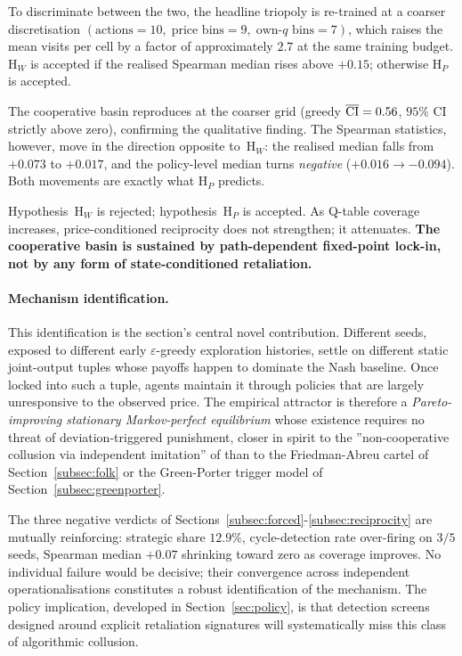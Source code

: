 To discriminate between the two, the headline triopoly is
re-trained at a coarser discretisation
$(\text{actions} = 10,\;\text{price bins} = 9,\;
\text{own-}q\text{ bins} = 7)$, which raises the mean visits per
cell by a factor of approximately $2.7$ at the same training
budget. H$_W$ is accepted if the realised Spearman median rises
above $+0.15$; otherwise H$_P$ is accepted.

The cooperative basin reproduces at the coarser grid (greedy
$\overline{\mathrm{CI}} = 0.56$, $95\%$ CI strictly above zero), confirming the
qualitative finding. The Spearman statistics, however, move in
the direction opposite to~H$_W$: the realised median falls from
$+0.073$ to $+0.017$, and the policy-level median turns
\emph{negative} ($+0.016 \to -0.094$). Both movements are
exactly what H$_P$ predicts.

\begin{verdict*}
Hypothesis~H$_W$ is rejected; hypothesis~H$_P$ is accepted. As
Q-table coverage increases, price-conditioned reciprocity does
not strengthen; it attenuates. \textbf{The cooperative basin is
sustained by path-dependent fixed-point lock-in, not by any form
of state-conditioned retaliation.}
\end{verdict*}

\paragraph{Mechanism identification.}
This identification is the section's central novel contribution.
Different seeds, exposed to different early $\varepsilon$-greedy
exploration histories, settle on different static joint-output
tuples whose payoffs happen to dominate the Nash baseline. Once
locked into such a tuple, agents maintain it through policies
that are largely unresponsive to the observed price. The
empirical attractor is therefore a \emph{Pareto-improving
stationary Markov-perfect equilibrium} whose existence requires
no threat of deviation-triggered punishment, closer in spirit
to the ''non-cooperative collusion via independent imitation'' of
\citet{vegaredondo1997} than to the Friedman-Abreu cartel of
Section~\ref{subsec:folk} or the Green-Porter trigger model of Section~\ref{subsec:greenporter}.

The three negative verdicts of
Sections~\ref{subsec:forced}-\ref{subsec:reciprocity} are
mutually reinforcing: strategic share $12.9\%$, cycle-detection
rate over-firing on $3/5$ seeds, Spearman median $+0.07$
shrinking toward zero as coverage improves. No individual
failure would be decisive; their convergence across independent
operationalisations constitutes a robust identification of the
mechanism. The policy implication, developed in
Section~\ref{sec:policy}, is that detection screens designed
around explicit retaliation signatures will systematically miss
this class of algorithmic collusion.

